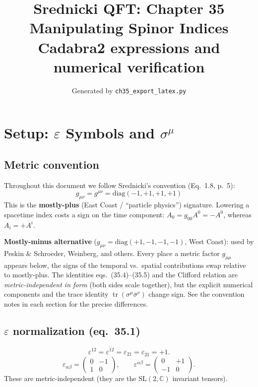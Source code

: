 \documentclass[12pt]{article}
\title{\textbf{Srednicki QFT: Chapter 35}\\[6pt]
       \large Manipulating Spinor Indices\\[4pt]
       \normalsize Cadabra2 expressions and numerical verification}
\author{Generated by \texttt{ch35\_export\_latex.py}}
\date{}
\begin{document}
\maketitle
\tableofcontents
\newpage

\section{Setup: \texorpdfstring{$\varepsilon$}{epsilon} Symbols
         and \texorpdfstring{$\sigma^\mu$}{sigma\^{}mu}}

\subsection{Metric convention}

Throughout this document we follow Srednicki's convention (Eq.~1.8, p.~5):
\begin{equation}
  \boxed{g_{\mu\nu} = g^{\mu\nu} = \mathrm{diag}(-1,+1,+1,+1)}
  \tag{1.8}
\end{equation}
This is the \textbf{mostly-plus} (East Coast / ``particle physics'') signature.
Lowering a spacetime index costs a sign on the time component:
$A_0 = g_{00}A^0 = -A^0$, whereas $A_i = +A^i$.

\begin{metricnote}
\textbf{Mostly-minus alternative} ($g_{\mu\nu} = \mathrm{diag}(+1,-1,-1,-1)$, West Coast):
used by Peskin \& Schroeder, Weinberg, and others.
Every place a metric factor $g_{\mu\mu}$ appears below, the signs of the
temporal vs.\ spatial contributions swap relative to mostly-plus.
The identities eqs.~(35.4)--(35.5) and the Clifford relation are
\emph{metric-independent in form} (both sides scale together), but
the explicit numerical components and the trace identity
$\operatorname{tr}(\sigma^\mu\bar\sigma^\nu)$ change sign.
See the convention notes in each section for the precise differences.
\end{metricnote}

\subsection{\texorpdfstring{$\varepsilon$}{epsilon} normalization (eq.~35.1)}
\begin{equation}
  \varepsilon^{12} = \varepsilon^{\dot{1}\dot{2}}
  = \varepsilon_{21} = \varepsilon_{\dot{2}\dot{1}} = +1.
  \tag{35.1}
\end{equation}
\[
  \varepsilon_{\alpha\beta} = \begin{pmatrix}0 & -1\\1 & 0\end{pmatrix},\qquad
  \varepsilon^{\alpha\beta} = \begin{pmatrix}0 & +1\\-1 & 0\end{pmatrix}.
\]
These are metric-independent (they are the SL$(2,\mathbb{C})$ invariant tensors).
\end{document}
